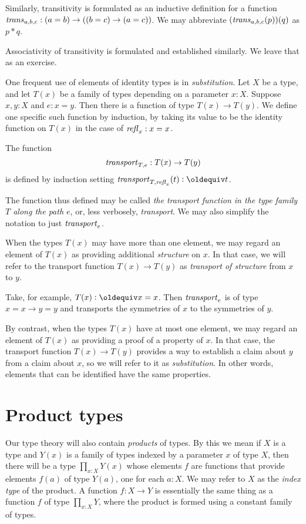Similarly, transitivity is formulated as an inductive definition for a function $\mathop{\mathit{trans}}_{a,b,c} : (a=b) \to ((b=c) \to (a=c))$.  We may
abbreviate $(\mathop{\mathit{trans}}_{a,b,c}(p))(q)$ as $p*q$.

Associativity of transitivity is formulated and established similarly.  We leave that as an exercise.

One frequent use of elements of identity types is in \emph{substitution}.  Let $X$ be a type, and let $T(x)$ be a family of types depending on a
parameter $x:X$.  Suppose $x,y:X$ and $e:x=y$.  Then there is a function of type $T(x) \to T(y)$. We define one specific such function by induction, by taking its value to be the identity function on $T(x)$ in the case of $\mathop{{\it refl}_{x}}:x=x$.
\begin{definition}\label{def:transport} The function
  \[ 
  \mathord{\mathit{transport}}_{T,e} : T(x) \to T(y)
  \]
  is defined by induction setting $\trp_{T,\refl{x}} (t) \defeq t$.
\end{definition} 
The function thus defined may be called 
\emph{the transport function in the type family $T$ along the path $e$}, 
 or, less verbosely, \emph{transport}.
 We may also simplify the notation to just $\mathord{\mathit{transport}}_e$.

When the types $T(x)$ may have more than one element, 
we may regard an element of $T(x)$ as providing additional {\em structure} on $x$. 
In that case, we will refer to the transport function $T(x) \to T(y)$ as 
\emph{transport of structure} from $x$ to $y$. 

Take, for example, $T(x)\defeq x=x$. 
Then $\mathord{\mathit{transport}}_e$ is of type $x=x \to y=y$ and transports the
symmetries of $x$ to the symmetries of $y$.

By contrast, when the types
$T(x)$ have at most one element, we may regard an element of $T(x)$ 
as providing a proof of a property of $x$. In that case, the transport
function $T(x) \to T(y)$ provides a way to establish a claim about $y$ 
from a claim about $x$, so we will refer to it as \emph{substitution}.  In
other words, elements that can be identified have the same properties.

\section{Product types}
\label{sec:product-types}
Our type theory will also contain \emph{products} of types. 
By this we mean if $X$ is a type and $Y(x)$ is a family of types indexed by a
parameter $x$ of type $X$, then there will be a type $\prod_{x:X} Y(x)$ 
whose elements $f$ are functions that provide elements $f(a)$ of type
$Y(a)$, one for each $a:X$. We may refer to $X$ as the 
\emph{index type} of the product. 
A function $f : X \to Y$ is essentially the same thing as a function $f$ 
of type $\prod_{x:X} Y$, where the product is formed using a constant family of types.

